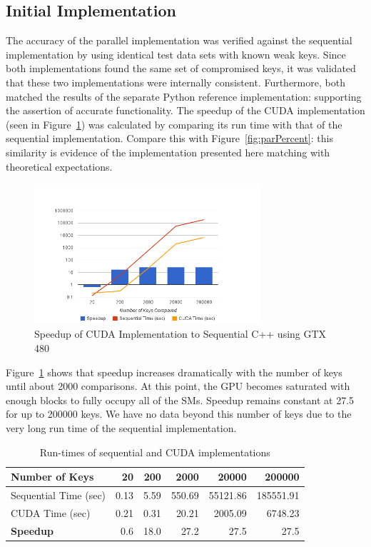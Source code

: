 \documentclass[smallextended]{svjour3}       %
\begin{document}
\subsection{Initial Implementation}
\label{subsec:initimpl}
The accuracy of the parallel implementation was verified against the 
sequential implementation by using identical test data sets with known 
weak keys. Since both implementations found the same set of compromised keys,
it was validated that these two implementations were internally consistent.
Furthermore, both matched the results of the separate Python reference
implementation: supporting the assertion of accurate functionality. The speedup
of the CUDA implementation (seen in Figure~\ref{fig:speedup}) was calculated by
comparing its run time with that of the sequential implementation. Compare this
with Figure~\ref{fig:parPercent}: this similarity is evidence of the
implementation presented here matching with theoretical expectations.

\begin{figure}
   \centering
   \includegraphics[width=0.75\textwidth]{chart_1}
   \caption{Speedup of CUDA Implementation to Sequential C++ using GTX 480}
   \label{fig:speedup}
\end{figure}

Figure~\ref{fig:speedup} shows that speedup increases dramatically with 
the number of keys until about 2000 comparisons. At this point, the GPU
becomes saturated with enough blocks to fully occupy all of the SMs. Speedup
remains constant at 27.5 for up to 200000 keys. We have no data beyond this
number of keys due to the very long run time of the sequential implementation. 

\begin{table}
   \centering
   \begin{tabular}{|l|*{5}{r}|}\hline
      Number of Keys        & 20   & 200  & 2000   & 20000    & 200000 \\ \hline
      Sequential Time (sec) & 0.13 & 5.59 & 550.69 & 55121.86 & 185551.91\\
      CUDA Time (sec)       & 0.21 & 0.31 & 20.21  & 2005.09  & 6748.23\\\hline
      \textbf{Speedup}      & 0.6  & 18.0 & 27.2   & 27.5     & 27.5\\\hline
   \end{tabular}
   \caption{Run-times of sequential and CUDA implementations}
   \label{tab:runtimes}
\end{table}
\end{document}
